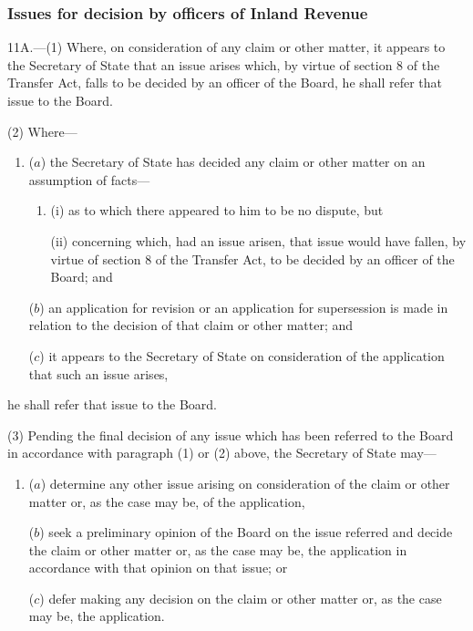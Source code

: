\documentclass[12pt,a4paper]{article}
\begin{document}
\subsubsection[11A. Issues for decision by officers of Inland Revenue]{Issues for decision by officers of Inland Revenue}

11A.---(1)  Where, on consideration of any claim or other matter, it appears to the Secretary of State that an issue arises which, by virtue of section 8 of the Transfer Act, falls to be decided by an officer of the Board, he shall refer that issue to the Board.

(2) Where—
\begin{enumerate}\item[]
($a$) the Secretary of State has decided any claim or other matter on an assumption of facts—
\begin{enumerate}\item[]
(i) as to which there appeared to him to be no dispute, but

(ii) concerning which, had an issue arisen, that issue would have fallen, by virtue of section 8 of the Transfer Act, to be decided by an officer of the Board; and
\end{enumerate}

($b$) an application for revision or an application for supersession is made in relation to the decision of that claim or other matter; and

($c$) it appears to the Secretary of State on consideration of the application that such an issue arises,
\end{enumerate}
he shall refer that issue to the Board.

(3) Pending the final decision of any issue which has been referred to the Board in accordance with paragraph (1) or (2) above, the Secretary of State may—
\begin{enumerate}\item[]
($a$) determine any other issue arising on consideration of the claim or other matter or, as the case may be, of the application,

($b$) seek a preliminary opinion of the Board on the issue referred and decide the claim or other matter or, as the case may be, the application in accordance with that opinion on that issue; or

($c$) defer making any decision on the claim or other matter or, as the case may be, the application.
\end{enumerate}
\end{document}
